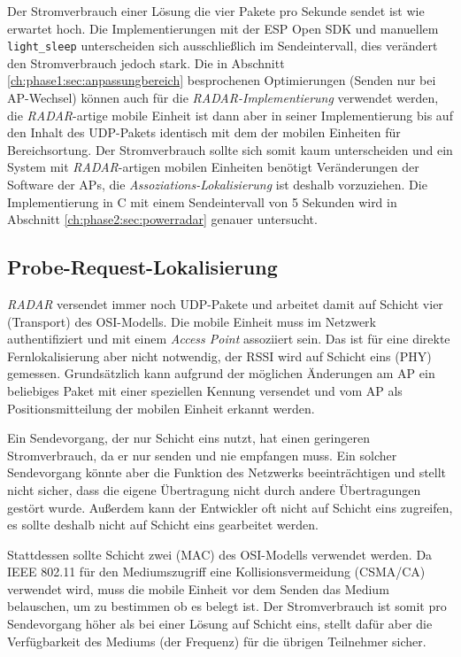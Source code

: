 Der Stromverbrauch einer Lösung die vier Pakete pro Sekunde sendet ist wie erwartet hoch.
Die Implementierungen mit der ESP Open SDK und manuellem \texttt{light\_sleep} unterscheiden sich ausschließlich im Sendeintervall, dies verändert den Stromverbrauch jedoch stark.
Die in Abschnitt \ref{ch:phase1:sec:anpassungbereich} besprochenen Optimierungen (Senden nur bei AP-Wechsel) können auch für die \emph{RADAR-Implementierung} verwendet werden, die \emph{RADAR}-artige mobile Einheit ist dann aber in seiner Implementierung bis auf den Inhalt des UDP-Pakets identisch mit dem der mobilen Einheiten für Bereichsortung.
Der Stromverbrauch sollte sich somit kaum unterscheiden und ein System mit \emph{RADAR}-artigen mobilen Einheiten benötigt Veränderungen der Software der APs, die \emph{Assoziations-Lokalisierung} ist deshalb vorzuziehen. 
Die Implementierung in C mit einem Sendeintervall von 5 Sekunden wird in Abschnitt \ref{ch:phase2:sec:powerradar} genauer untersucht.

\subsection{Probe-Request-Lokalisierung}
\label{ch:phase2:sec:anpassungbereich}
\emph{RADAR} versendet immer noch UDP-Pakete und arbeitet damit auf Schicht vier (Transport) des OSI-Modells. 
Die mobile Einheit muss im Netzwerk authentifiziert und mit einem \emph{Access Point} assoziiert sein.
Das ist für eine direkte Fernlokalisierung aber nicht notwendig, der RSSI wird auf Schicht eins (PHY) gemessen.
Grundsätzlich kann aufgrund der möglichen Änderungen am AP ein beliebiges Paket mit einer speziellen Kennung versendet und vom AP als Positionsmitteilung der mobilen Einheit erkannt werden. 

Ein Sendevorgang, der nur Schicht eins nutzt, hat einen geringeren Stromverbrauch, da er nur senden und nie empfangen muss.
Ein solcher Sendevorgang könnte aber die Funktion des Netzwerks beeinträchtigen und stellt nicht sicher, dass die eigene Übertragung nicht durch andere Übertragungen gestört wurde.
Außerdem kann der Entwickler oft nicht auf Schicht eins zugreifen, es sollte deshalb nicht auf Schicht eins gearbeitet werden.

Stattdessen sollte Schicht zwei (MAC) des OSI-Modells verwendet werden. 
Da IEEE 802.11 für den Mediumszugriff eine Kollisionsvermeidung (CSMA/CA) verwendet wird, muss die mobile Einheit vor dem Senden das Medium belauschen, um zu bestimmen ob es belegt ist.
Der Stromverbrauch ist somit pro Sendevorgang höher als bei einer Lösung auf Schicht eins, stellt dafür aber die Verfügbarkeit des Mediums (der Frequenz) für die übrigen Teilnehmer sicher. 

